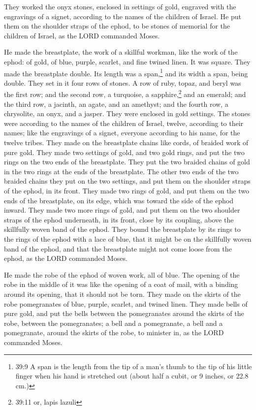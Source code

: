\myverse{}They worked the onyx stones, enclosed in settings of gold, engraved
with the engravings of a signet, according to the names of the children of Israel.
\myverse{}He put them on the shoulder straps of the ephod, to be stones of memorial for
the children of Israel, as the LORD commanded Moses.


\myverse{}He made the breastplate, the work of a skillful workman, like
the work of the ephod: of gold, of blue, purple, scarlet, and fine twined linen.
\myverse{}It was square. They made the breastplate double. Its length was a span,\footnote{39:9 A span is the length from the tip of a man’s thumb to the tip of his little finger when his hand
	is stretched out (about half a cubit, or 9 inches, or 22.8 cm.)} and its width a span, being double.
\myverse{}They set in it four rows of stones. A row of ruby, topaz, and beryl was the
first row;
\myverse{}and the second row, a turquoise, a sapphire,\footnote{39:11 or, lapis lazuli} and an emerald;
\myverse{}and the third row, a jacinth, an agate, and an amethyst;
\myverse{}and the fourth row, a chrysolite, an onyx, and a jasper. They were enclosed
in gold settings.
\myverse{}The stones were according to the names of the children of Israel, twelve,
according to their names; like the engravings of a signet, everyone according to his name, for the twelve
tribes.
\myverse{}They made on the breastplate chains like cords, of braided work of pure gold.
\myverse{}They made two settings of gold, and two gold rings, and put the two rings
on the two ends of the breastplate.
\myverse{}They put the two braided chains of gold in the two rings at the ends of the
breastplate.
\myverse{}The other two ends of the two braided chains they put on the two settings,
and put them on the shoulder straps of the ephod, in its front.
\myverse{}They made two rings of gold, and put them on the two ends of the breastplate,
on its edge, which was toward the side of the ephod inward.
\myverse{}They made two more rings of gold, and put them on the two shoulder straps
of the ephod underneath, in its front, close by its coupling, above the skillfully woven band of the ephod.
\myverse{}They bound the breastplate by its rings to the rings of the ephod with a
lace of blue, that it might be on the skillfully woven band of the ephod, and that the breastplate might
not come loose from the ephod, as the LORD commanded Moses.


\myverse{}He made the robe of the ephod of woven work, all of blue.
\myverse{}The opening of the robe in the middle of it was like the opening of a coat
of mail, with a binding around its opening, that it should not be torn.
\myverse{}They made on the skirts of the robe pomegranates of blue, purple, scarlet,
and twined linen.
\myverse{}They made bells of pure gold, and put the bells between the pomegranates
around the skirts of the robe, between the pomegranates;
\myverse{}a bell and a pomegranate, a bell and a pomegranate, around the skirts of
the robe, to minister in, as the LORD commanded Moses.


